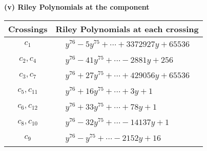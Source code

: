 \documentclass[1p]{elsarticle_modified}
\theoremstyle{definition}
\begin{document}
\flushleft \textbf{(v) Riley Polynomials at the component}\newline \\
\begin{tabular}{m{50pt}|m{274pt}}
Crossings & \hspace{64pt}Riley Polynomials at each crossing \\
\hline $$\begin{aligned}c_{1}\end{aligned}$$&$\begin{aligned}
&y^{76}-5 y^{75}+\cdots+3372927 y+65536
\end{aligned}$\\
\hline $$\begin{aligned}c_{2},c_{4}\end{aligned}$$&$\begin{aligned}
&y^{76}-41 y^{75}+\cdots-2881 y+256
\end{aligned}$\\
\hline $$\begin{aligned}c_{3},c_{7}\end{aligned}$$&$\begin{aligned}
&y^{76}+27 y^{75}+\cdots+429056 y+65536
\end{aligned}$\\
\hline $$\begin{aligned}c_{5},c_{11}\end{aligned}$$&$\begin{aligned}
&y^{76}+16 y^{75}+\cdots+3 y+1
\end{aligned}$\\
\hline $$\begin{aligned}c_{6},c_{12}\end{aligned}$$&$\begin{aligned}
&y^{76}+33 y^{75}+\cdots+78 y+1
\end{aligned}$\\
\hline $$\begin{aligned}c_{8},c_{10}\end{aligned}$$&$\begin{aligned}
&y^{76}-32 y^{75}+\cdots-14137 y+1
\end{aligned}$\\
\hline $$\begin{aligned}c_{9}\end{aligned}$$&$\begin{aligned}
&y^{76}- y^{75}+\cdots-2152 y+16
\end{aligned}$\\
\hline
\end{tabular}\\~\\
\end{document}
